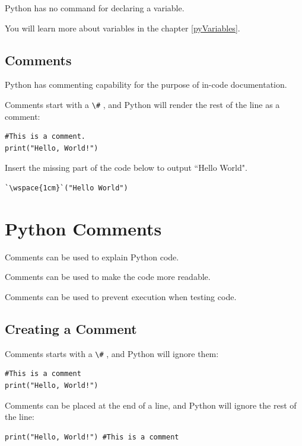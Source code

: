 \documentclass[12pt,a4paper]{article}
\newcommand{\wspace}[1]{%
	\color{white}\colorbox{white}{\texttt{#1}}%
}
\newcommand{\code}[1]{%
	\colorbox{backcolour}{\lstinline{#1}}%
}
\begin{document}
Python has no command for declaring a variable.

You will learn more about variables in the chapter \ref{pyVariables}.
\subsection{Comments}
Python has commenting capability for the purpose of in-code documentation.

Comments start with a \code{\#}, and Python will render the rest of the line as a comment:

\begin{ebox}
	\begin{lstlisting}
#This is a comment.
print("Hello, World!")
	\end{lstlisting}
\end{ebox}
\begin{tbox}
Insert the missing part of the code below to output ``Hello World".

\begin{lstlisting}[numbers=none]
`\wspace{1cm}`("Hello World")
\end{lstlisting}
\end{tbox}
\vfill\newpage
\section{Python Comments}
Comments can be used to explain Python code.

Comments can be used to make the code more readable.

Comments can be used to prevent execution when testing code.

\subsection{Creating a Comment}

Comments starts with a \code{\#}, and Python will ignore them:

\begin{ebox}
	\begin{lstlisting}
#This is a comment
print("Hello, World!")
	\end{lstlisting}
\end{ebox}

Comments can be placed at the end of a line, and Python will ignore the rest of
the line:

\begin{ebox}
	\begin{lstlisting}
print("Hello, World!") #This is a comment
	\end{lstlisting}
\end{ebox}
\end{document}
